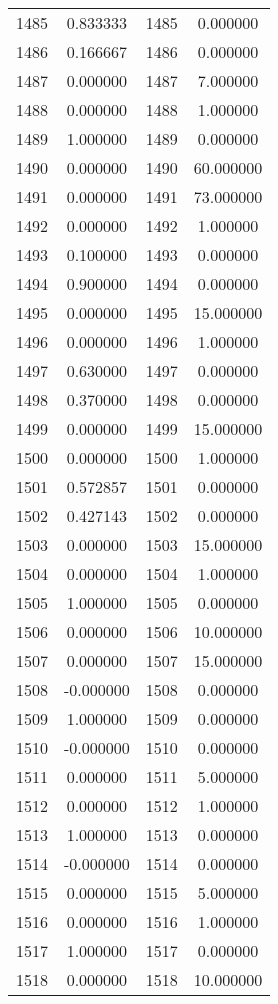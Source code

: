 \documentclass[12pt]{article}
\begin{document}
\begin{longtable}{@{}cccc@{}}
1485 & 0.833333 & 1485 & 0.000000 \\
1486 & 0.166667 & 1486 & 0.000000 \\
1487 & 0.000000 & 1487 & 7.000000 \\
1488 & 0.000000 & 1488 & 1.000000 \\
1489 & 1.000000 & 1489 & 0.000000 \\
1490 & 0.000000 & 1490 & 60.000000 \\
1491 & 0.000000 & 1491 & 73.000000 \\
1492 & 0.000000 & 1492 & 1.000000 \\
1493 & 0.100000 & 1493 & 0.000000 \\
1494 & 0.900000 & 1494 & 0.000000 \\
1495 & 0.000000 & 1495 & 15.000000 \\
1496 & 0.000000 & 1496 & 1.000000 \\
1497 & 0.630000 & 1497 & 0.000000 \\
1498 & 0.370000 & 1498 & 0.000000 \\
1499 & 0.000000 & 1499 & 15.000000 \\
1500 & 0.000000 & 1500 & 1.000000 \\
1501 & 0.572857 & 1501 & 0.000000 \\
1502 & 0.427143 & 1502 & 0.000000 \\
1503 & 0.000000 & 1503 & 15.000000 \\
1504 & 0.000000 & 1504 & 1.000000 \\
1505 & 1.000000 & 1505 & 0.000000 \\
1506 & 0.000000 & 1506 & 10.000000 \\
1507 & 0.000000 & 1507 & 15.000000 \\
1508 & -0.000000 & 1508 & 0.000000 \\
1509 & 1.000000 & 1509 & 0.000000 \\
1510 & -0.000000 & 1510 & 0.000000 \\
1511 & 0.000000 & 1511 & 5.000000 \\
1512 & 0.000000 & 1512 & 1.000000 \\
1513 & 1.000000 & 1513 & 0.000000 \\
1514 & -0.000000 & 1514 & 0.000000 \\
1515 & 0.000000 & 1515 & 5.000000 \\
1516 & 0.000000 & 1516 & 1.000000 \\
1517 & 1.000000 & 1517 & 0.000000 \\
1518 & 0.000000 & 1518 & 10.000000 \\

\end{longtable}
\end{document}
